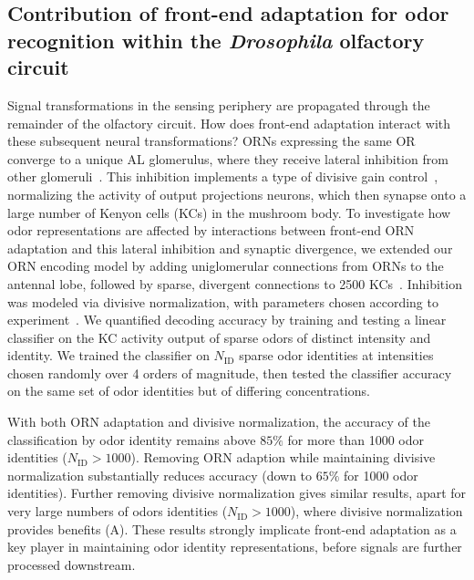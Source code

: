 \documentclass[9pt,lineno]{elife}
\begin{document}
\subsection{Contribution of front-end adaptation for odor recognition within the \textit{Drosophila} olfactory circuit}



Signal transformations in the sensing periphery are propagated through the remainder of the olfactory circuit. How does front-end adaptation interact with these subsequent neural transformations? ORNs expressing the same OR converge to a unique AL glomerulus, where they receive lateral inhibition from other glomeruli~\citep{lateral_inh, lateral_inh_asahina}. This inhibition implements a type of divisive gain control~\citep{divisive_normalization}, normalizing the activity of output projections neurons, which then synapse onto a large number of Kenyon cells (KCs) in the mushroom body. To investigate how odor representations are affected by interactions between front-end ORN adaptation and this lateral inhibition and synaptic divergence, we extended our ORN encoding model by adding uniglomerular connections from ORNs to the antennal lobe, followed by sparse, divergent connections to 2500 KCs~\citep{memory_review, litwinkumar, abbott_axel}. Inhibition was modeled via divisive normalization, with parameters chosen according to experiment~\citep{divisive_normalization}.
We quantified decoding accuracy by training and testing a linear classifier on the KC activity output of sparse odors of distinct intensity and identity. We trained the classifier on $N_{{\text {ID}}}$ sparse odor identities at intensities chosen randomly over 4 orders of magnitude, then tested the classifier accuracy on the same set of odor identities but of differing concentrations. 

{\color{blue} With both ORN adaptation and divisive normalization, the accuracy of the classification by odor identity remains above $85\%$ for more than 1000 odor identities ($N_{{\text {ID}}}>1000$). Removing ORN adaption while maintaining divisive normalization substantially reduces accuracy (down to $65\%$ for 1000 odor identities). Further removing divisive normalization gives similar results, apart for very large numbers of odors identities ($N_{{\text {ID}}}>1000$), where divisive normalization provides benefits (A). These results strongly implicate front-end adaptation as a key player in maintaining odor identity representations, before signals are further processed downstream. }
\end{document}
